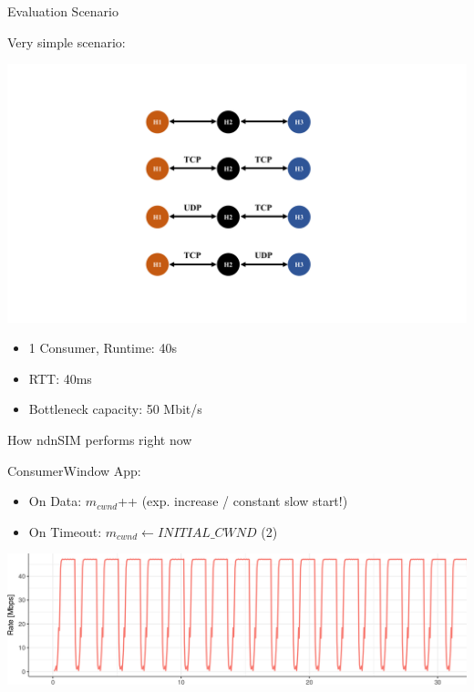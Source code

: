 \begin{frame}{Evaluation Scenario}

Very simple scenario: 

\includegraphics[width=\linewidth]{figs/Figure_3.pdf}

\begin{itemize}
\item 1 Consumer, Runtime: 40s 
\item RTT: 40ms 
\item Bottleneck capacity: 50 Mbit/s 
\end{itemize}


\end{frame}


\begin{frame}{How ndnSIM performs right now}

ConsumerWindow App: 

\begin{itemize}
\item On Data: $m_{cwnd}$++ \pause (exp. increase / constant slow start!)
\pause
\item On Timeout: $m_{cwnd} \leftarrow INITIAL\_CWND$ (2)
\end{itemize}

\pause
\includegraphics[width=\linewidth]{figs/cons1.png}


\end{frame}

